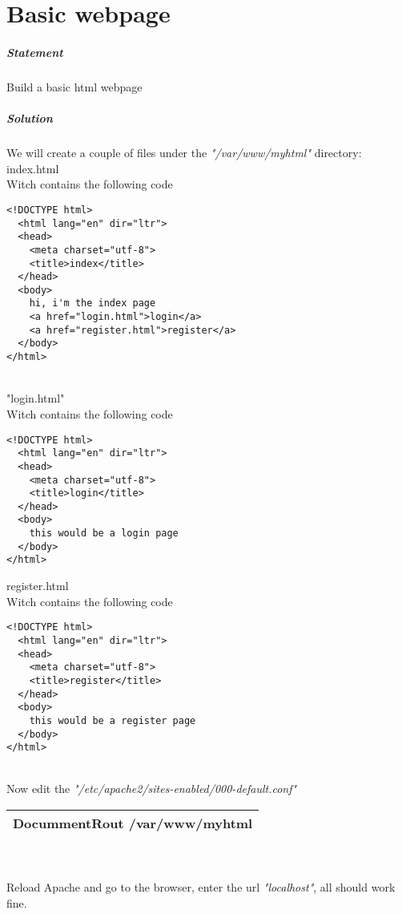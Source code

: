 \documentclass[a4paper,10pt]{article}
\newcommand\tab[1][1cm]{\hspace*{#1}}
\begin{document}
\section{Basic webpage}
\subparagraph{Statement}
Build a basic html webpage
\subparagraph{Solution}
We will create a couple of files under the {\it "/var/www/myhtml"} directory:\vspace{0.5cm}\\\tab
index.html\\Witch contains the following code
\begin{verbatim}
<!DOCTYPE html>
  <html lang="en" dir="ltr">
  <head>
    <meta charset="utf-8">
    <title>index</title>
  </head>
  <body>
    hi, i'm the index page
    <a href="login.html">login</a>
    <a href="register.html">register</a>
  </body>
</html>
\end{verbatim}
\vspace{0.5cm}\\\tab "login.html"\\Witch contains the following code
\begin{verbatim}
<!DOCTYPE html>
  <html lang="en" dir="ltr">
  <head>
    <meta charset="utf-8">
    <title>login</title>
  </head>
  <body>
    this would be a login page
  </body>
</html>
\end{verbatim}
\tab register.html\\Witch contains the following code
\begin{verbatim}
<!DOCTYPE html>
  <html lang="en" dir="ltr">
  <head>
    <meta charset="utf-8">
    <title>register</title>
  </head>
  <body>
    this would be a register page
  </body>
</html>
\end{verbatim}
\vspace{0.5cm}\\
Now edit the {\it "/etc/apache2/sites-enabled/000-default.conf"}
\vspace{0.5cm}\\\begin{tabular}{|l|}\hline
DocummentRout /var/www/myhtml
\\\hline\end{tabular}\vspace{0.5cm}\\
\vspace{0.5cm}\\
Reload Apache and go to the browser, enter the url {\it "localhost"}, all should work fine.
\end{document}
